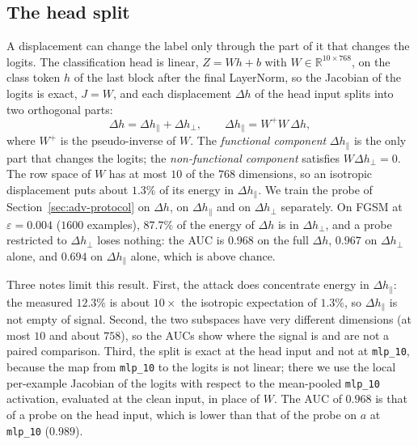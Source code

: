 \documentclass[../ppgc-tese.tex]{subfiles}
\begin{document}
\subsection{The head split}
\label{sec:adv-head-split}
A displacement can change the label only through the part of it that changes
the logits. The classification head is linear, $Z = Wh + b$ with
$W\in\mathbb{R}^{10\times768}$, on the class token $h$ of the last block after
the final LayerNorm, so the Jacobian of the logits is exact, $J=W$, and each
displacement $\Delta h$ of the head input splits into two orthogonal parts:
\begin{equation}
  \Delta h = \Delta h_{\parallel} + \Delta h_{\perp},
  \qquad \Delta h_{\parallel} = W^{+}W\,\Delta h,
  \label{eq:adv-split}
\end{equation}
where $W^{+}$ is the pseudo-inverse of $W$. The \emph{functional component}
$\Delta h_{\parallel}$ is the only part that changes the logits; the
\emph{non-functional component} satisfies $W\Delta h_{\perp}=0$. The row space
of $W$ has at most $10$ of the $768$ dimensions, so an isotropic displacement
puts about $1.3\%$ of its energy in $\Delta h_{\parallel}$. We train the probe
of Section~\ref{sec:adv-protocol} on $\Delta h$, on $\Delta h_{\parallel}$ and
on $\Delta h_{\perp}$ separately. On FGSM at $\varepsilon{=}0.004$ ($1600$
examples), $87.7\%$ of the energy of $\Delta h$ is in $\Delta h_{\perp}$, and
a probe restricted to $\Delta h_{\perp}$ loses nothing: the AUC is $0.968$ on
the full $\Delta h$, $0.967$ on $\Delta h_{\perp}$ alone, and $0.694$ on
$\Delta h_{\parallel}$ alone, which is above chance.

Three notes limit this result. First, the attack does concentrate energy in
$\Delta h_{\parallel}$: the measured $12.3\%$ is about $10\times$ the isotropic
expectation of $1.3\%$, so $\Delta h_{\parallel}$ is not empty of signal.
Second, the two subspaces have very different dimensions (at most $10$ and
about $758$), so the AUCs show where the signal is and are not a paired
comparison. Third, the split is exact at the head input and not at
\texttt{mlp\_10}, because the map from \texttt{mlp\_10} to the logits is not
linear; there we use the local per-example Jacobian of the logits with respect
to the mean-pooled \texttt{mlp\_10} activation, evaluated at the clean input,
in place of $W$. The AUC of $0.968$ is that of a probe on the head input,
which is lower than that of the probe on $a$ at \texttt{mlp\_10} ($0.989$).
\end{document}
